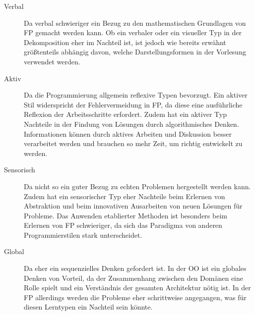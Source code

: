 \begin{description}
    \item[Verbal] Da verbal schwieriger ein Bezug zu den mathematischen Grundlagen von FP gemacht werden kann. Ob ein verbaler oder ein visueller Typ in der Dekomposition eher im Nachteil ist, ist jedoch wie bereits erwähnt größtenteils abhängig davon, welche Darstellungsformen in der Vorlesung verwendet werden.
    \item[Aktiv] Da die Programmierung allgemein reflexive Typen bevorzugt. Ein aktiver Stil widerspricht der Fehlervermeidung in FP, da diese eine ausführliche Reflexion der Arbeitsschritte erfordert. Zudem hat ein aktiver Typ Nachteile in der Findung von Lösungen durch algorithmisches Denken. Informationen können durch aktives Arbeiten und Diskussion besser verarbeitet werden und brauchen so mehr Zeit, um richtig entwickelt zu werden. 
    \item[Sensorisch] Da nicht so ein guter Bezug zu echten Problemen hergestellt werden kann. Zudem hat ein sensorischer Typ eher Nachteile beim Erlernen von Abstraktion und beim innovativen Ausarbeiten von neuen Lösungen für Probleme. Das Anwenden etablierter Methoden ist besonders beim Erlernen von FP schwieriger, da sich das Paradigma von anderen Programmierstilen stark unterscheidet.
    \item[Global] Da eher ein sequenzielles Denken gefordert ist. In der OO ist ein globales Denken von Vorteil, da der Zusammenhang zwischen den Domänen eine Rolle spielt und ein Verständnis der gesamten Architektur nötig ist. In der FP allerdings werden die Probleme eher schrittweise angegangen, was für diesen Lerntypen ein Nachteil sein könnte.
\end{description}